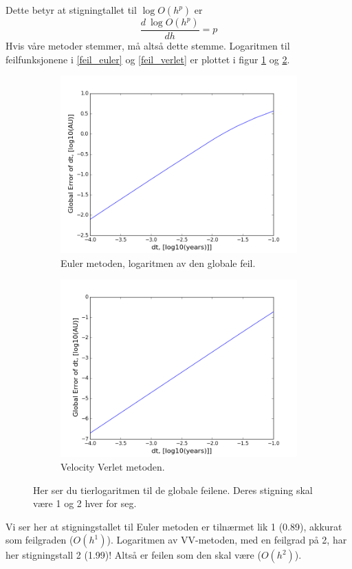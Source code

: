 \documentclass[11pt,a4paper]{article}
\begin{document}
Dette betyr at stigningtallet til $\log{O(h^{p})}$ er 
$$\frac{d \ \log{O(h^{p})}}{dh} =  p $$ 
Hvis våre metoder stemmer, må altså dette stemme. Logaritmen til feilfunksjonene i \ref{feil_euler} og \ref{feil_verlet} er plottet i 
figur \ref{1swag} og \ref{2swag}.\\

\FloatBarrier
\begin{figure}[!ht]
\centering
\begin{subfigure}{.5\textwidth}
  \includegraphics[width=1.1\linewidth]{Euler_Global2.png}
  \caption{Euler metoden, logaritmen av den globale feil.}
  \label{1swag}
\end{subfigure}%
\begin{subfigure}{.5\textwidth}
  \centering
  \includegraphics[width=1.1\linewidth]{Verlet_Global2.png}
  \caption{Velocity Verlet metoden. }
  \label{2swag}
\end{subfigure}
\caption{Her ser du tierlogaritmen til de globale feilene. Deres stigning skal være 1 og 2 hver for seg.}
\label{fig:duhh}
\end{figure}
\FloatBarrier
Vi ser her at stigningstallet til Euler metoden er tilnærmet lik 1 (0.89), akkurat som feilgraden ($O(h^{1})$). Logaritmen av VV-metoden, med en feilgrad på 2, har her stigningstall 2 (1.99)! Altså er feilen som den skal være  ($O(h^{2})$).
\end{document}
